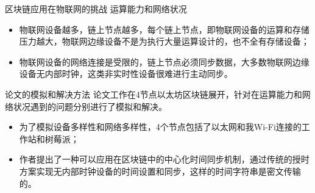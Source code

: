 \documentclass{beamer}
\begin{document}
\begin{frame}{区块链应用在物联网的挑战}
	运算能力和网络状况
	\begin{itemize}
		\item 物联网设备越多，链上节点越多，每个链上节点，即物联网设备的运算和存储压力越大，物联网边缘设备不是为执行大量运算设计的，也不全有存储设备；
		\item 物联网设备的网络连接是受限的，链上节点必须同步数据，大多数物联网边缘设备无内部时钟，这类非实时性设备很难进行主动同步。
	\end{itemize}
\end{frame}

\begin{frame}{论文的模拟和解决方法}
	论文工作在4节点以太坊区块链展开，针对在运算能力和网络状况遇到的问题分别进行了模拟和解决。
	\begin{itemize}
		\item 为了模拟设备多样性和网络多样性，4个节点包括了以太网和我Wi-Fi连接的工作站和树莓派；
		\item 作者提出了一种可以应用在区块链中的中心化时间同步机制，通过传统的授时方案实现无内部时钟设备的时间设置和同步，这样的时间字符串是密文传输的。
	\end{itemize}
\end{frame}
\end{document}
